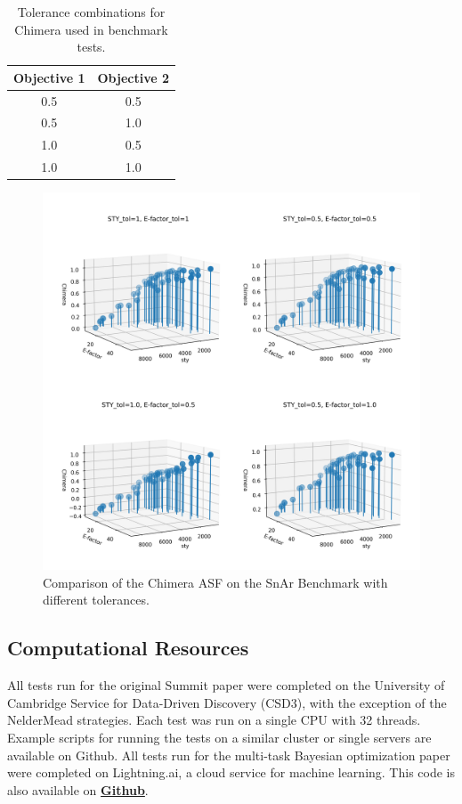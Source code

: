 \begin{table}
    \centering
    \caption{Tolerance combinations for Chimera used in benchmark tests.}
    \begin{tabular}{cc}
         Objective 1 & Objective 2  \\
         \hline
         0.5 & 0.5 \\
         0.5 & 1.0 \\
         1.0 & 0.5 \\
         1.0 & 1.0 \\
    \end{tabular}
    \label{tab:chimera_tolerances}
\end{table}

\begin{figure}
    \includegraphics[width=\textwidth]{gfx/Chapter03/chimera_comparison.png}
    \caption{Comparison of the Chimera ASF on the SnAr Benchmark with different tolerances.}
    \label{fig:chimera_comparsion}
\end{figure}

\subsection{Computational Resources}
All tests run for the original Summit paper were completed on the University of Cambridge Service for Data-Driven Discovery (CSD3), with the exception of the NelderMead strategies. Each test was run on a single CPU with 32 threads. Example scripts for running the tests on a similar cluster or single servers are available on Github. All tests run for the multi-task Bayesian optimization paper were completed on Lightning.ai, a cloud service for machine learning. This code is also available on \textbf{\href{https://github.com/sustainable-processes/multitask}{Github}}.


